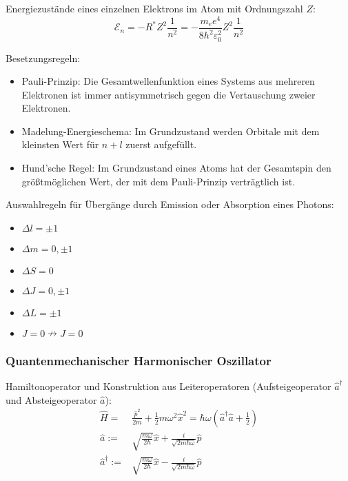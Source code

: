 \documentclass[11pt]{article}
\numberwithin{equation}{section}
\begin{document}
				\noindent
				Energiezustände eines einzelnen Elektrons im Atom mit Ordnungszahl $Z$:
				\begin{equation}
					\mathcal{E}_n = -R^* Z^2 \frac{1}{n^2} = - \frac{m_e e^4}{8 h^2 \varepsilon_0^2} Z^2 \frac{1}{n^2}
				\end{equation}

				\noindent
				Besetzungsregeln:
				\begin{itemize}
					\item Pauli-Prinzip: Die Gesamtwellenfunktion eines Systems aus mehreren Elektronen ist immer antisymmetrisch	gegen die Vertauschung zweier Elektronen.
					\item Madelung-Energieschema: Im Grundzustand werden Orbitale mit dem kleinsten Wert für $n+l$ zuerst aufgefüllt.
					\item Hund'sche Regel: Im Grundzustand eines Atoms hat der Gesamtspin den größtmöglichen Wert, der mit dem Pauli-Prinzip verträgtlich ist.
				\end{itemize}

				\noindent
				Auswahlregeln für Übergänge durch Emission oder Absorption eines Photons:
				\begin{itemize}
					\item $\Delta l = \pm 1$
					\item $\Delta m = 0, \pm 1$
					\item $\Delta S = 0$
					\item $\Delta J = 0, \pm 1$
					\item $\Delta L = \pm 1$
					\item $J=0 \nrightarrow J=0$
				\end{itemize}

			\subsubsection{Quantenmechanischer Harmonischer Oszillator}
				\noindent
				Hamiltonoperator und Konstruktion aus Leiteroperatoren (Aufsteigeoperator $\hat{a}^\dagger$ und Absteigeoperator $\hat{a}$):
				\begin{equation}
					\begin{aligned}
						\hat{H} =& \frac{\hat{p}^2}{2m} + \frac{1}{2}m\omega^2 \hat{x}^2 = \hbar\omega(\hat{a}^\dagger \hat{a} + \frac{1}{2}) \\
						\hat{a} :=& \sqrt{\frac{m\omega}{2\hbar}}\hat{x} + \frac{i}{\sqrt{2m\hbar\omega}}\hat{p} \\
						\hat{a}^\dagger :=& \sqrt{\frac{m\omega}{2\hbar}}\hat{x} - \frac{i}{\sqrt{2m\hbar\omega}}\hat{p} \\
					\end{aligned}
				\end{equation}
\end{document}
